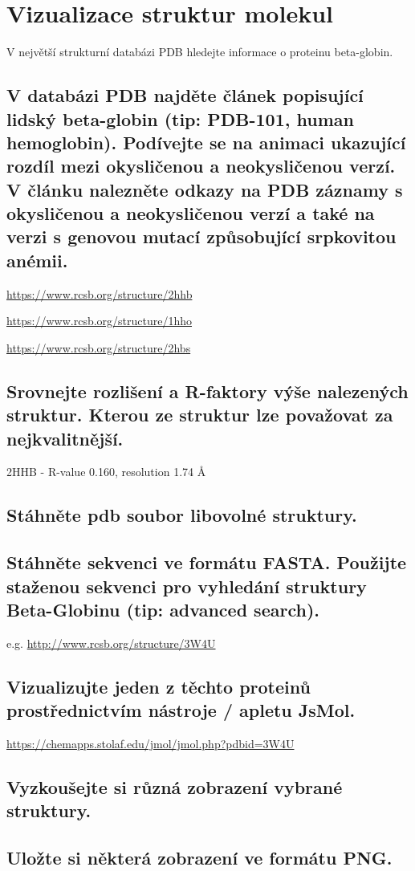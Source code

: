 \documentclass[11pt]{article}
\begin{document}
\section{Vizualizace struktur molekul}
\label{sec:org8c6ed3f}
V největší strukturní databázi PDB hledejte informace o proteinu beta-globin.

\subsection{V databázi PDB najděte článek popisující lidský beta-globin (tip: PDB-101, human hemoglobin). Podívejte se na animaci ukazující rozdíl mezi okysličenou a neokysličenou verzí. V článku nalezněte odkazy na PDB záznamy s okysličenou a neokysličenou verzí a také na verzi s genovou mutací způsobující srpkovitou anémii.}
\label{sec:org349f5ea}
\url{https://www.rcsb.org/structure/2hhb}

\url{https://www.rcsb.org/structure/1hho}

\url{https://www.rcsb.org/structure/2hbs}
\subsection{Srovnejte rozlišení a R-faktory výše nalezených struktur. Kterou ze struktur lze považovat za nejkvalitnější.}
\label{sec:orge235137}
2HHB - R-value 0.160, resolution 1.74 \AA{}
\subsection{Stáhněte pdb soubor libovolné struktury.}
\label{sec:org3f7c9bd}
\subsection{Stáhněte sekvenci ve formátu FASTA. Použijte staženou sekvenci pro vyhledání struktury Beta-Globinu (tip: advanced search).}
\label{sec:org398758b}
e.g. \url{http://www.rcsb.org/structure/3W4U}
\subsection{Vizualizujte jeden z těchto proteinů prostřednictvím nástroje / apletu JsMol.}
\label{sec:orgd1eb58d}
\url{https://chemapps.stolaf.edu/jmol/jmol.php?pdbid=3W4U}
\subsection{Vyzkoušejte si různá zobrazení vybrané struktury.}
\label{sec:orgd63ffec}
\subsection{Uložte si některá zobrazení ve formátu PNG.}
\label{sec:org5b2784e}
\end{document}

